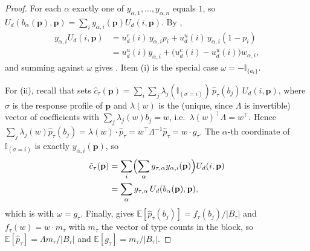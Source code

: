 \documentclass[letterpaper,9pt,twocolumn]{extarticle}
\newcommand{\pvec}{\mathbf{p}}
\newcommand{\EE}{\mathbb{E}}
\theoremstyle{plain}
\theoremstyle{definition}
\theoremstyle{remark}
\begin{document}
\begin{proof}
For each $\alpha$ exactly one of $y_{\alpha,1},\dots,y_{\alpha,n}$ equals $1$,
so $U_d(b_\alpha(\pvec),\pvec)=\sum_i y_{\alpha,i}(\pvec)U_d(i,\pvec)$. By
,
\begin{align*}
y_{\alpha,i}U_d(i,\pvec)
&=u_d^c(i)\,y_{\alpha,i}p_i+u_d^u(i)\,y_{\alpha,i}(1-p_i)\\
&=u_d^u(i)y_{\alpha,i}+\bigl(u_d^c(i)-u_d^u(i)\bigr)w_{\alpha,i},
\end{align*}
and summing against $\omega$ gives . Item (i) is the
special case $\omega=-\mathbb{I}_{\{a_t\}}$.

For (ii), recall that \citet[Eq.~2]{balcan2015} sets
$\hat c_\tau(\pvec)=\sum_{i}\sum_{j}\lambda_j(\mathbb{I}_{(\sigma=i)})\,
\hat p_\tau(b_j)\,U_d(i,\pvec)$, where $\sigma$ is the response profile of
$\pvec$ and $\lambda(w)$ is the (unique, since $\Lambda$ is invertible)
vector of coefficients with $\sum_j\lambda_j(w)b_j=w$, i.e.\
$\lambda(w)^{\!\top}\Lambda=w^{\!\top}$. Hence
$\sum_j\lambda_j(w)\hat p_\tau(b_j)=\lambda(w)\cdot\hat p_\tau
= w^{\!\top}\Lambda^{-1}\hat p_\tau=w\cdot g_\tau$. The $\alpha$-th coordinate
of $\mathbb{I}_{(\sigma=i)}$ is exactly $y_{\alpha,i}(\pvec)$, so
\begin{align*}
\hat c_\tau(\pvec)
&=\sum_{i}\Bigl(\sum_\alpha g_{\tau,\alpha}y_{\alpha,i}(\pvec)\Bigr)U_d(i,\pvec)\\
&=\sum_{\alpha}g_{\tau,\alpha}\,U_d(b_\alpha(\pvec),\pvec),
\end{align*}
which is  with $\omega=g_\tau$. Finally, \citet[Lemma 6.3]{balcan2015} gives
$\EE[\hat p_\tau(b_j)]=f_\tau(b_j)/|B_\tau|$ and $f_\tau(w)=w\cdot m_\tau$
with $m_\tau$ the vector of type counts in the block, so
$\EE[\hat p_\tau]=\Lambda m_\tau/|B_\tau|$ and
$\EE[g_\tau]=m_\tau/|B_\tau|$.
\end{proof}
\end{document}
